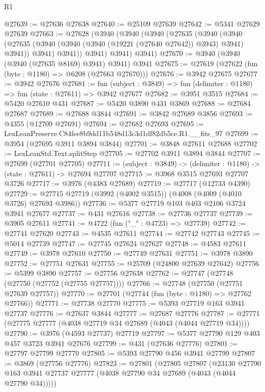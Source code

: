 \begin{lexlean}{R1}
\begin{coremodule}
@27639 := @27636 @27638
@27640 := @25109 @27639
@27642 := @5341 @27629 @27639
@27663 := @27628
    (@3940
      (@3940
        (@3940
          (@27635
            (@3940
              (@3940
                (@27635 (@3940 (@3940 (@3940 (@19221 (@27640 @27642)) @3943) @3941) @3941))
                @3941)
              @3941))
          @3941)
        @3941)
      @3941)
@27670 := @3940 (@3940 (@3940 (@27635 @8169) @3941) @3941) @3941
@27675 := @27619 (@27622 (fun (byte : @1180) => @6208 (@27663 @27670)))
@27676 := @3942 @27675
@27677 := @3942 @27676
@27681 := fun (subject : @3849) => fun (delimiter : @1180) => fun (state : @27611) => @3942 @27677
@27682 := @3951 @3515
@27684 := @5420 @27610 @431
@27687 := @5420 @3890 @431 @3869
@27688 := @27684 @27687
@27689 := @27688 @3844
@27691 := @3842 @27689 @3856
@27693 := @4355 (@12709 @27691)
@27694 := @27682 @27693
@27695 := LexLeanPreserve.C84fee8b9dd11b548d13c3d1df82db5ce.R1.__fits_97
@27699 := @3954 (@27695 @3911 @3894 @3844)
@27701 := @3848 @27611 @27688
@27702 := LexLeanStd.Text.splitStep
@27705 := @27702 @3911 @3894 @3844
@27707 := @27699 (@27701 @27705)
@27711 := (subject : @3849) -> (delimiter : @1180) -> (state : @27611) -> @27694 @27707
@27715 := @3968 @3515 @27693 @27707 @3726
@27717 := @3976 (@4383 @27689)
@27719 := @27717 (@12733 @4390)
@27729 := @27715 @27719 (@3992 (@4002 @3515)) (@4008 (@4009 (@4010 @3726) @27693 @3986))
@27736 := @5377 @27719 @103 @403 @2106 @3724 @3941 @27677
@27737 := @431 @27616
@27738 := @27736 @27737
@27739 := @3905 @27611
@27741 := @4722 (fun ("_" : @4723) => @27739)
@27742 := @27741 @27620
@27743 := @4535 @27611
@27744 := @27742 @27743
@27745 := @5014 @27739
@27747 := @27745 @27624 @27627
@27748 := @4583 @27611
@27749 := @3978 @27610
@27750 := @27749 @27631
@27751 := @3978 @3890
@27752 := @27751 @27631
@27755 := @25709 (@24800 @27639 @27642)
@27756 := @5399 @3890
@27757 := @27756 @27638
@27762 := @27747 (@27748 (@27750 (@27752 (@27755 @27757))))
@27766 := @27748 (@27750 (@27751 @27639 @27757))
@27770 := @27701 (@27744 (fun (byte : @1180) => @27762 @27766))
@27771 := @27738 @27770
@27775 := @5393 @27719 @163 @3941 @27737
@27776 := @27637 @3844
@27777 := @27687 @27776
@27787 := @27771 (@27775 @27777 (@4038 @27719 @34 @27689 (@4043 (@4044 @27719 @34))))
@27790 := @3976 (@4593 @27737) @27719
@27797 := @5377 @27790 @129 @403 @457 @3723 @3941 @27676
@27799 := @431 (@27636 @27776)
@27801 := @27797 @27799 @27770
@27805 := @5393 @27790 @456 @3941 @27799
@27807 := @3869 (@27756 @27776)
@27823 := @27801
    (@27805
      @27807
      (@23130 @27790 @163 @3941 @27737 @27777 (@4038 @27790 @34 @27689 (@4043 (@4044 @27790 @34)))))

\end{coremodule}
\end{lexlean}
